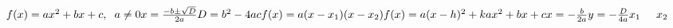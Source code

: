 
$
\vspace{5mm} f(x) = ax^{2} + bx + c, \hspace{2mm} a \neq 0 \\ \\
\vspace{5mm} x = \frac{-b \pm \sqrt{D}}{2a} \\
\vspace{5mm} D = b^{2} - 4ac \\
\vspace{5mm} f(x) = a(x - x_{1})(x - x_{2}) \\
\vspace{5mm} f(x) = a(x - h)^{2} + k \\
\vspace{5mm} ax^{2} + bx + c \\
\vspace{5mm} x = - \frac{b}{2a} \\
\vspace{5mm} y = - \frac{D}{4a} \\
\vspace{5mm} x_1 \hspace{5mm} x_2 \\
$
